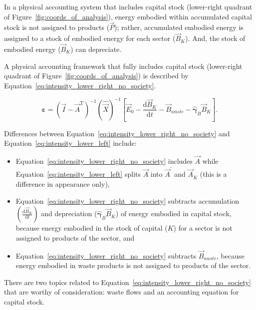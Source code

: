 In a physical accounting system that includes capital stock
(lower-right quadrant of Figure~\ref{fig:coords_of_analysis}), 
energy embodied within accumulated capital stock
is not assigned to products ($\vec{P}$); 
rather, accumulated embodied energy is assigned to a stock of embodied energy
for each sector ($\vec{B}_{K}$).
And, the stock of embodied energy ($\vec{B}_{K}$)
can depreciate.

A physical accounting framework that fully includes capital stock
(lower-right quadrant of Figure~\ref{fig:coords_of_analysis}) 
is described by Equation~\ref{eq:intensity_lower_right_no_society}. 

\begin{equation} \label{eq:intensity_lower_right_no_society}
	\boldsymbol{\varepsilon}
	= {\left( \vec{I} - {\vec{A}}^{\mathrm{T}} \right)}^{-1}
		{\left( \hat{\vec{X}}  \right)}^{-1}
		\left[ \vec{E}_{0}
			  - \frac{\mathrm{d}\vec{B}_{K}}{\mathrm{d}t}
			  - \vec{B}_{waste}
			  - \hat{\boldsymbol{\gamma}}_{B} \vec{B}_{K} \right].
\end{equation}

\noindent{}Differences between Equation~\ref{eq:intensity_lower_right_no_society}
and Equation~\ref{eq:intensity_lower_left} include:

\begin{itemize}
	\item{Equation~\ref{eq:intensity_lower_right_no_society} includes $\vec{A}$
	while Equation~\ref{eq:intensity_lower_left} splits $\vec{A}$ into
	$\vec{A}^{'}$ and $\vec{A}_{\dot{K}}$ (this is a difference in appearance only),}
	\item{Equation~\ref{eq:intensity_lower_right_no_society} subtracts
	accumulation $\left( \frac{\mathrm{d}\vec{B}_{K}}{\mathrm{d}t} \right)$
	and depreciation ($\hat{\boldsymbol{\gamma}}_{B} \vec{B}_{K}$)
	of energy embodied in capital stock,
	because energy embodied in the stock of capital ($K$)
	for a sector
	is not assigned to products of the sector, and}
	\item{Equation~\ref{eq:intensity_lower_right_no_society} subtracts $\vec{B}_{waste}$,
	because energy embodied in waste products is not assigned to 
	products of the sector.}
\end{itemize}

There are two topics related to Equation~\ref{eq:intensity_lower_right_no_society} 
that are worthy of consideration:
waste flows and an accounting equation for capital stock.



